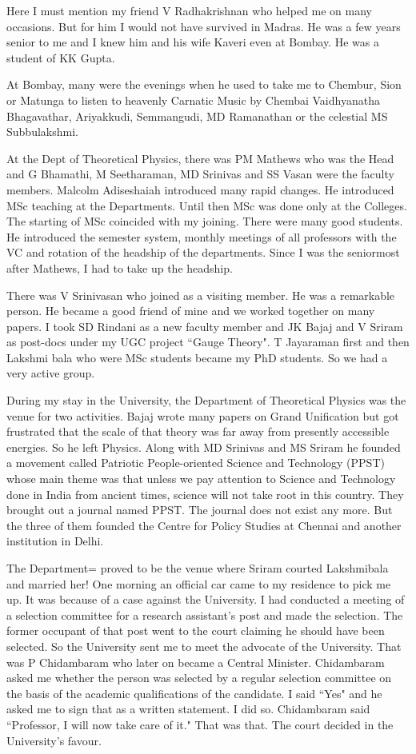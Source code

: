 Here I must mention my friend V Radhakrishnan who helped me on many 
occasions. But for him I would not have survived in Madras. He was a few 
years senior to me and I knew him and his wife Kaveri even at Bombay. He 
was a student of KK Gupta.

At Bombay, many were the evenings when he used to take me to Chembur, 
Sion or Matunga to listen to heavenly Carnatic Music by Chembai 
Vaidhyanatha Bhagavathar, Ariyakkudi, Semmangudi, MD Ramanathan or the 
celestial MS Subbulakshmi.

At the Dept of Theoretical Physics, there was PM Mathews who was the 
Head and G Bhamathi, M Seetharaman, MD Srinivas and SS Vasan were the 
faculty members. Malcolm Adise\-shaiah introduced many rapid changes. He 
introduced MSc teaching at the Departments. Until then MSc was done only 
at the Colleges. The starting of MSc coincided with my joining. There 
were many good students. He introduced the semester system, monthly 
meetings of all professors with the VC and rotation of the headship of 
the departments. Since I was the seniormost after Mathews, I had to take 
up the headship.

There was V Srinivasan who joined as a visiting member. He was a 
remarkable person. He became a good friend of mine and we worked 
together on many papers. I took SD Rindani as a new faculty member and 
JK Bajaj and V Sriram as post-docs under my UGC project ``Gauge Theory". 
T Jayaraman first and then La\-kshmi bala who were MSc students became my 
PhD students. So we had a very active group.

During my stay in the University, the Department of Theore\-tical Physics 
was the venue for two activities. Bajaj wrote many papers on Grand 
Unification but got frustrated that the scale of that theory was far 
away from presently accessible energies. So he left Physics. Along with 
MD Srinivas and MS Sriram he founded a movement called Patriotic 
People-oriented Science and Technology (PPST) whose main theme was that 
unless we pay attention to Science and Technology done in India from 
anci\-ent times, science will not take root in this country. They brou\-ght 
out a journal named PPST. The journal does not exist any more. But the 
three of them founded the Centre for Policy Stu\-dies at Chennai and 
another institution in Delhi.

The Department= proved to be the venue where Sriram cour\-ted Lakshmibala 
and married her!
\vskip 1pt
One morning an official car came to my residence to pick me up. It was 
because of a case against the University. I had condu\-cted a meeting of a 
selection committee for a research assistant's post and made the 
selection. The former occupant of that post went to the court claiming 
he should have been selected. So the University sent me to meet the 
advocate of the University. That was P Chidambaram who later on became a 
Central Minister. Chidambaram asked me whether the person was selected 
by a regular selection committee on the basis of the academic 
qualifications of the candidate. I said ``Yes" and he asked me to sign 
that as a written statement. I did so. Chidambaram said ``Profe\-ssor, I 
will now take care of it." That was that. The court decided in the 
University's favour.

